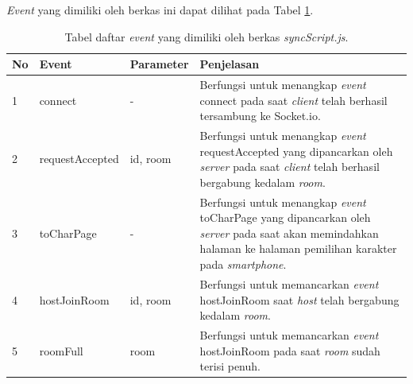 \begin{enumerate}
\begin{enumerate}
\begin{enumerate}
			\textit{Event} yang dimiliki oleh berkas ini dapat dilihat pada Tabel \ref{table:event_syncScript}.
			\begin{table}[H]
				\centering
				\caption{Tabel daftar \textit{event} yang dimiliki oleh berkas \textit{syncScript.js}.}
				\begin{tabular}{|p{0.35cm}|p{3cm}|p{3cm}|p{7cm}|}
					\hline
					No & Event & Parameter & Penjelasan \\ \hline
					1 & connect & - & Berfungsi untuk menangkap \textit{event} connect pada saat \textit{client} telah berhasil tersambung ke Socket.io. \\ \hline
					2 & requestAccepted & id, room & Berfungsi untuk menangkap \textit{event} requestAccepted yang dipancarkan oleh \textit{server} pada saat \textit{client} telah berhasil bergabung kedalam \textit{room}. \\ \hline
					3 & toCharPage & - & Berfungsi untuk menangkap \textit{event} toCharPage yang dipancarkan oleh \textit{server} pada saat akan memindahkan halaman ke halaman pemilihan karakter pada \textit{smartphone}.  \\ \hline
					4 & hostJoinRoom & id, room & Berfungsi untuk memancarkan \textit{event} hostJoinRoom saat \textit{host} telah bergabung kedalam \textit{room}. \\ \hline
					5 & roomFull & room & Berfungsi untuk memancarkan \textit{event} hostJoinRoom pada saat \textit{room} sudah terisi penuh. \\ \hline
				\end{tabular}
				\label{table:event_syncScript}
			\end{table}
%				
%				

\end{enumerate}
\end{enumerate}
\end{enumerate}

